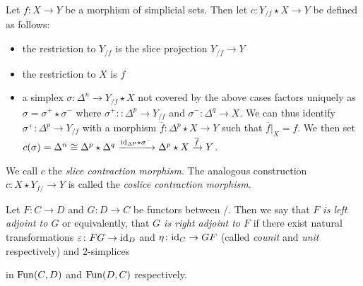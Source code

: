 \begin{construction}
    Let $f\colon X\to Y$ be a morphism of simplicial sets.
    Then let $c\colon Y_{/f}\star X\to Y$ be defined as follows:
    \begin{itemize}
        \item the restriction to $Y_{/f}$ is the slice projection $Y_{/f}\to Y$
        \item the restriction to $X$ is $f$
        \item a simplex $\sigma\colon\Delta^n\to Y_{/f}\star X$ not covered by the above cases factors uniquely as $\sigma=\sigma^+\star\sigma^-$ where $\sigma^+\colon\colon\Delta^p\to Y_{/f}$ and $\sigma^-\colon\Delta^q\to X$.
              We can thus identify $\sigma^+\colon\Delta^p\to Y_{/f}$ with a morphism $\overline{f}\colon\Delta^p\star X\to Y$ such that $\overline{f}|_{X}=f$.
              We then set $c(\sigma)=\Delta^n\cong\Delta^p\star\Delta^q\xrightarrow{\text{id}_{\Delta^p}\star\sigma^-}\Delta^p\star X\xrightarrow{\overline{f}} Y$.
    \end{itemize}
    We call $c$ the \emph{slice contraction morphism}.
    The analogous construction $c\colon X\star Y_{f/}\to Y$ is called the \emph{coslice contraction morphism}.
    \begin{reference}
        \cite[Construction 4.3.5.12]{kerodon}
    \end{reference}
\end{construction}
\begin{definition}[Adjoints]
    Let $F\colon C\to D$ and $G\colon D\to C$ be functors between \inftycats/.
    Then we say that \emph{$F$ is left adjoint to $G$} or equivalently, that \emph{$G$ is right adjoint to $F$}
    if there exist natural transformations $\varepsilon\colon FG\to \text{id}_D$ and $\eta\colon\text{id}_C\to GF$ (called \emph{counit} and \emph{unit} respectively) and $2$-simplices 
    \begin{center}
    \end{center}
    in $\operatorname{Fun}(C,D)$ and $\operatorname{Fun}(D,C)$ respectively.
\end{definition}
